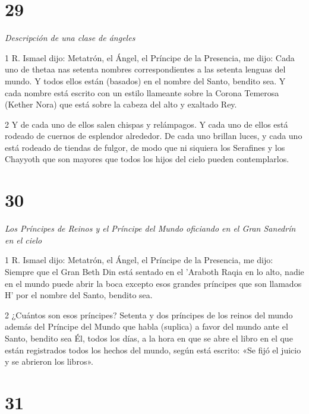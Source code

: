 \chapter{29}

\par \textit{Descripción de una clase de ángeles}

\par 1 R. Ismael dijo: Metatrón, el Ángel, el Príncipe de la Presencia, me dijo: Cada uno de thetaa nas setenta nombres correspondientes a las setenta lenguas del mundo. Y todos ellos están (basados) en el nombre del Santo, bendito sea. Y cada nombre está escrito con un estilo llameante sobre la Corona Temerosa (Kether Nora) que está sobre la cabeza del alto y exaltado Rey.

\par 2 Y de cada uno de ellos salen chispas y relámpagos. Y cada uno de ellos está rodeado de cuernos de esplendor alrededor. De cada uno brillan luces, y cada uno está rodeado de tiendas de fulgor, de modo que ni siquiera los Serafines y los Chayyoth que son mayores que todos los hijos del cielo pueden contemplarlos.

\chapter{30}

\par \textit{Los Príncipes de Reinos y el Príncipe del Mundo oficiando en el Gran Sanedrín en el cielo}

\par 1 R. Ismael dijo: Metatrón, el Ángel, el Príncipe de la Presencia, me dijo: Siempre que el Gran Beth Din está sentado en el 'Araboth Raqia en lo alto, nadie en el mundo puede abrir la boca excepto esos grandes príncipes que son llamados H' por el nombre del Santo, bendito sea.

\par 2 ¿Cuántos son esos príncipes? Setenta y dos príncipes de los reinos del mundo además del Príncipe del Mundo que habla (suplica) a favor del mundo ante el Santo, bendito sea Él, todos los días, a la hora en que se abre el libro en el que están registrados todos los hechos del mundo, según está escrito: «Se fijó el juicio y se abrieron los libros».

\chapter{31}

